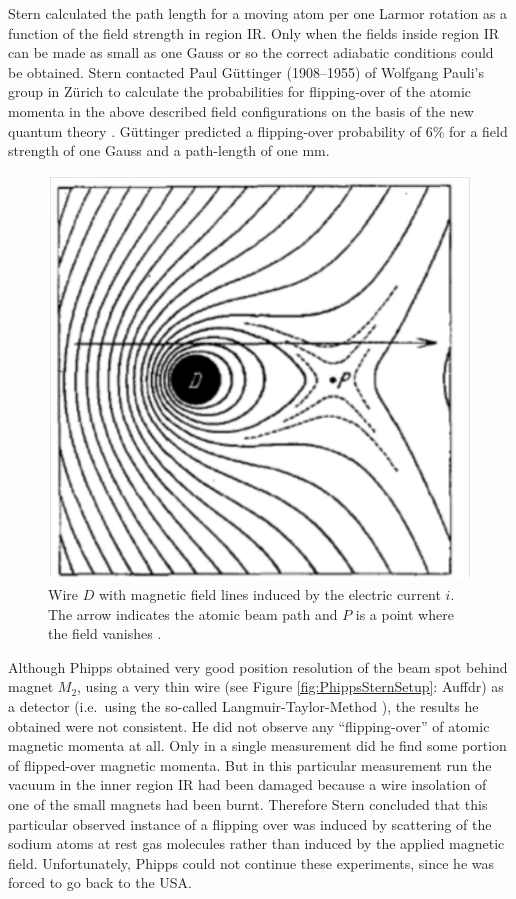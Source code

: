 \documentclass{article}
\begin{document}
Stern calculated the path length for a moving atom per one Larmor rotation as a function of the field strength in region IR. Only when the fields inside region IR can be made as small as one Gauss or so the correct adiabatic conditions could be obtained. Stern contacted Paul Güttinger (1908--1955) of Wolfgang Pauli's group in Zürich to calculate the probabilities for flipping-over of the atomic momenta in the above described field configurations on the basis of the new quantum theory \citep{GuettingerP1932Verhalten}. Güttinger predicted a flipping-over probability of 6\% for a field strength of one Gauss and a path-length of one mm.
%
\begin{figure}
\begin{center}
\includegraphics[scale=0.4]{figures/FrischSegreField}
\caption{Wire $D$ with magnetic field lines induced by the electric current $i$. The arrow indicates the atomic beam path and $P$ is a point where the field vanishes \cite[p.~611]{FrischOEtal1933Einstellung}.}
\label{fig:FrischSegreField}
\end{center}
\end{figure}

Although Phipps obtained very good position resolution of the beam spot behind magnet $M_2$, using a very thin wire (see Figure \ref{fig:PhippsSternSetup}: Auffdr) as a detector (i.e.\ using the so-called Langmuir-Taylor-Method \citep{LangmuirI1925Effects}), the results he obtained were not consistent. He did not observe any ``flipping-over'' of atomic magnetic momenta at all. Only in a single measurement did he find some portion of flipped-over magnetic momenta. But in this particular measurement run the vacuum in the inner region IR had been damaged because a wire insolation of one of the small magnets had been burnt. Therefore Stern concluded that this particular observed instance of a flipping over was induced by scattering of the sodium atoms at rest gas molecules rather than induced by the applied magnetic field. Unfortunately, Phipps could not continue these experiments, since he was forced to go back to the USA.
\end{document}
